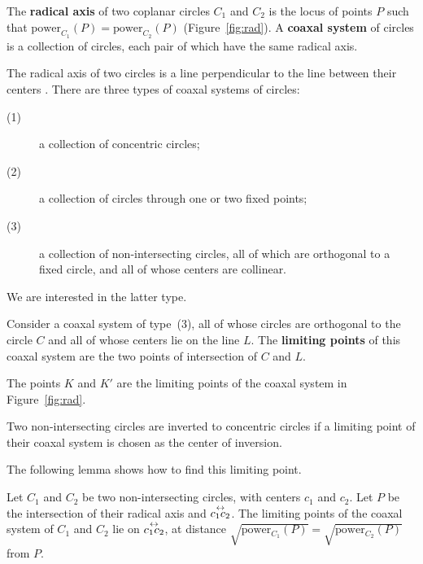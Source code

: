 \begin{defn2}
The {\bf radical axis} of two coplanar circles $C_1$ and $C_2$
is the locus of points $P$ such that $\mbox{power}_{C_1}(P) = 
\mbox{power}_{C_2}(P)$ (Figure~\ref{fig:rad}).
A {\bf coaxal system} of circles is a collection of circles, 
each pair of which have the same radical axis.
\end{defn2}

\begin{rmk}
\label{rmk:coa}
The radical axis of two circles is a line perpendicular to the line 
between their centers \cite{J29}. %
There are three types of coaxal systems of circles:
\begin{description}
\item[(1)]
	a collection of concentric circles;
\item[(2)]
	a collection of circles through one or two fixed points;
\item[(3)]
	a collection of non-intersecting circles, all of which are orthogonal
	to a fixed circle, and all of whose centers are collinear.
\end{description}
We are interested in the latter type.
\end{rmk}


\begin{defn2}
Consider a coaxal system of type~(3),
all of whose circles are orthogonal to the circle $C$ and
all of whose centers lie on the line $L$.
The {\bf limiting points} of this coaxal system are the two points of 
intersection of $C$ and $L$.
\end{defn2}

The points $K$ and $K'$ are the limiting points of the coaxal system
in Figure~\ref{fig:rad}.

\begin{lemma}
\cite{J29} %
\label{lem:cntr}
Two non-intersecting circles are inverted to concentric circles
if a limiting point of their coaxal system is chosen as
the center of inversion.
\end{lemma}

The following lemma shows how to find this limiting point.


\begin{lemma}
\cite{J29} %
\label{lem:sqrtp}
Let $C_1$ and $C_2$ be two non-intersecting circles, with centers $c_1$
and $c_2$.
Let $P$ be the intersection of their radical axis and $\mbox{$\stackrel{\leftrightarrow}{c_1c_2}$}$.
The limiting points of the coaxal system of $C_1$ and $C_2$
lie on $\mbox{$\stackrel{\leftrightarrow}{c_1c_2}$}$, at distance $\sqrt{\mbox{power$_{C_1}(P)$}} = 
\sqrt{\mbox{power$_{C_2}(P)$}}$ from $P$.
\end{lemma}

